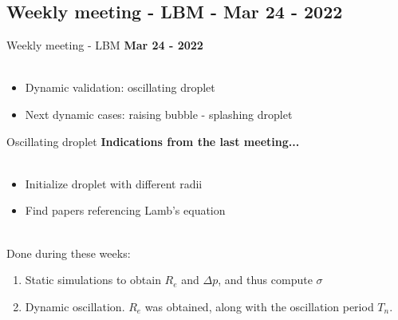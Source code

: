 \documentclass[8pt]{beamer}
\begin{document}
	\subsection{Weekly meeting - LBM - Mar 24 - 2022}\label{meet:LBM00324}
	\label{}
	\justifying
	\begin{frame}{Weekly meeting - LBM}
		\textbf{Mar 24 - 2022}\\~\\
		\begin{itemize}
			
			\item Dynamic validation: oscillating droplet
			\item Next dynamic cases: raising bubble - splashing droplet
			
		\end{itemize}
	\end{frame}
	
	\begin{frame}{Oscillating droplet}
		\textbf{Indications from the last meeting...}\\~\\
		\begin{itemize}
			\item Initialize droplet with different radii
			\item Find papers referencing Lamb's equation
		\end{itemize}
		
		
		~\\ Done during these weeks:
		\begin{enumerate}
			\item Static simulations to obtain $R_e$ and $\Delta p$, and thus compute $\sigma$
			\item Dynamic oscillation. $R_e$ was obtained, along with the oscillation period $T_n$.
		\end{enumerate}
	
	\end{frame}
	
\end{document}
